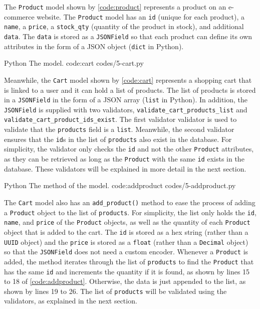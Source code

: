 The \verb|Product| model shown by \autoref{code:product} represents a product
on an e-commerce website. The \verb|Product| model has an \verb|id| (unique for
each product), a \verb|name|, a \verb|price|, a \verb|stock_qty| (quantity of
the product in stock), and additional \verb|data|. The \verb|data| is stored as
a \verb|JSONField| so that each product can define its own attributes in the
form of a JSON object (\verb|dict| in Python).

\listing
{Python}
{The  model.}
{code:cart}
{codes/5-cart.py}

Meanwhile, the \verb|Cart| model shown by \autoref{code:cart} represents a
shopping cart that is linked to a user and it can hold a list of products. The
list of products is stored in a \verb|JSONField| in the form of a JSON array
(\verb|list| in Python). In addition, the \verb|JSONField| is supplied with two
validators, \verb|validate_cart_products_list| and
\verb|validate_cart_product_ids_exist|. The first validator validator is used
to validate that the \verb|products| field is a \verb|list|. Meanwhile, the
second validator ensures that the \verb|id|s in the list of \verb|products|
also exist in the database. For simplicity, the validator only checks the
\verb|id| and not the other \verb|Product| attributes, as they can be retrieved
as long as the \verb|Product| with the same \verb|id| exists in the database.
These validators will be explained in more detail in the next section.

\listing
{Python}
{The  method of the  model.}
{code:addproduct}
{codes/5-addproduct.py}

The \verb|Cart| model also has an \verb|add_product()| method to ease the
process of adding a \verb|Product| object to the list of \verb|products|. For
simplicity, the list only holds the \verb|id|, \verb|name|, and \verb|price| of
the \verb|Product| objects, as well as the quantity of each \verb|Product|
object that is added to the cart. The \verb|id| is stored as a hex string
(rather than a \verb|UUID| object) and the \verb|price| is stored as a
\verb|float| (rather than a \verb|Decimal| object) so that the \verb|JSONField|
does not need a custom encoder. Whenever a \verb|Product| is added, the method
iterates through the list of \verb|products| to find the \verb|Product| that
has the same \verb|id| and increments the quantity if it is found, as shown by
lines 15 to 18 of \autoref{code:addproduct}. Otherwise, the data is just
appended to the list, as shown by lines 19 to 26. The list of \verb|products|
will be validated using the validators, as explained in the next section.


